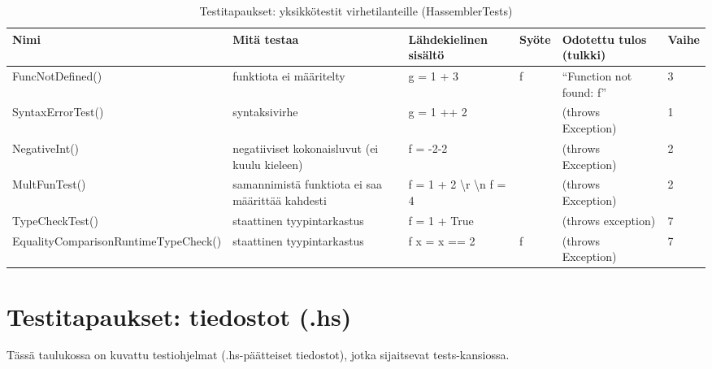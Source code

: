\documentclass[11pt]{article} %
\begin{document}
\begin{table}[!htbp] %
\caption{Testitapaukset: yksikkötestit virhetilanteille (HassemblerTests)}
\begin{tabular}{|p{3cm}|p{}|p{3cm}|p{}|p{3cm}|p{}|}
\hline
\textbf{Nimi} & \textbf{Mitä testaa} & \textbf{Lähdekielinen sisältö} & \textbf{Syöte}  & \textbf{Odotettu tulos (tulkki)}  & \textbf{Vaihe} \\ \hline
 FuncNotDefined()  & funktiota ei määritelty   &  g = 1 + 3       &  f       &  ``Function not found: f''   &  3            \\ \hline
 SyntaxErrorTest()     & syntaksivirhe   &  g = 1 ++ 2    &           &   (throws Exception)   &    1     \\ \hline
NegativeInt()              & negatiiviset kokonaisluvut (ei kuulu kieleen)   &  f = -2-2   & &   (throws Exception)                                     &  2              \\ \hline       
MultFunTest()      & samannimistä funktiota ei saa määrittää kahdesti   & f = 1 + 2 \textbackslash r \textbackslash n f = 4   &        &  (throws Exception)    &    2                                               \\ \hline       
TypeCheckTest()             & staattinen tyypintarkastus    &  f = 1 + True      &           & (throws exception)     &   7         \\ \hline          
Equality\-Comparison\-Runtime\-TypeCheck()             &   staattinen tyypintarkastus    & f x = x == 2             & f           & (throws Exception)                      &  7          \\ \hline          
\end{tabular}
\end{table}

\pagebreak

\section{Testitapaukset: tiedostot (.hs)}

Tässä taulukossa on kuvattu testiohjelmat (.hs-päätteiset tiedostot), jotka sijaitsevat tests-kansiossa.
\end{document}
